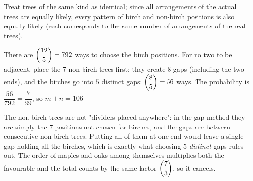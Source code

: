 Treat trees of the same kind as identical; since all arrangements of the actual trees are equally likely, every pattern of birch and non-birch positions is also equally likely (each corresponds to the same number of arrangements of the real trees).

There are $\dbinom{12}{5}=792$ ways to choose the birch positions. For no two to be adjacent, place the $7$ non-birch trees first; they create $8$ gaps (including the two ends), and the birches go into $5$ distinct gaps: $\dbinom85=56$ ways. The probability is $\dfrac{56}{792}=\dfrac{7}{99}$, so $m+n=\boxed{106}$.

The non-birch trees are not "dividers placed anywhere": in the gap method they are simply the $7$ positions not chosen for birches, and the gaps are between consecutive non-birch trees. Putting all of them at one end would leave a single gap holding all the birches, which is exactly what choosing $5$ \emph{distinct} gaps rules out. The order of maples and oaks among themselves multiplies both the favourable and the total counts by the same factor $\dbinom73$, so it cancels.
